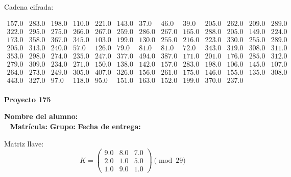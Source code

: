 \documentclass[12pt]{article}
\begin{document}
Cadena cifrada:
\begin{center}
$\begin{array}{lllllllllllll}
157.0 & 283.0 & 198.0 & 110.0 & 221.0 & 143.0 & 37.0 & 46.0 & 39.0 & 205.0 & 262.0 & 209.0 & 289.0\\
322.0 & 295.0 & 275.0 & 266.0 & 267.0 & 259.0 & 286.0 & 267.0 & 165.0 & 288.0 & 205.0 & 149.0 & 224.0\\
173.0 & 358.0 & 367.0 & 345.0 & 103.0 & 199.0 & 130.0 & 255.0 & 216.0 & 223.0 & 330.0 & 255.0 & 289.0\\
205.0 & 313.0 & 240.0 & 57.0 & 126.0 & 79.0 & 81.0 & 81.0 & 72.0 & 343.0 & 319.0 & 308.0 & 311.0\\
353.0 & 298.0 & 274.0 & 235.0 & 247.0 & 377.0 & 494.0 & 387.0 & 171.0 & 201.0 & 176.0 & 285.0 & 312.0\\
279.0 & 309.0 & 234.0 & 271.0 & 150.0 & 138.0 & 142.0 & 157.0 & 283.0 & 198.0 & 106.0 & 145.0 & 107.0\\
264.0 & 273.0 & 249.0 & 305.0 & 407.0 & 326.0 & 156.0 & 261.0 & 175.0 & 146.0 & 155.0 & 135.0 & 308.0\\
443.0 & 327.0 & 97.0 & 118.0 & 95.0 & 151.0 & 163.0 & 152.0 & 199.0 & 370.0 & 237.0\\
\end{array}$
\end{center}

\newpage


\textbf{Proyecto 175}

\textbf{Nombre del alumno:} \underline{\hspace{13cm}}\\\
\vspace{1cm}
\textbf{Matrícula:} \underline{\hspace{4cm}} \hspace{1cm}
\textbf{Grupo:} \underline{\hspace{2cm}}
\textbf{Fecha de entrega:} \underline{\hspace{2cm}}

\medskip

Matriz llave:
\[
K = \begin{pmatrix}
9.0 & 8.0 & 7.0\\
2.0 & 1.0 & 5.0\\
1.0 & 9.0 & 1.0
\end{pmatrix} \pmod{29}
\]
\end{document}
